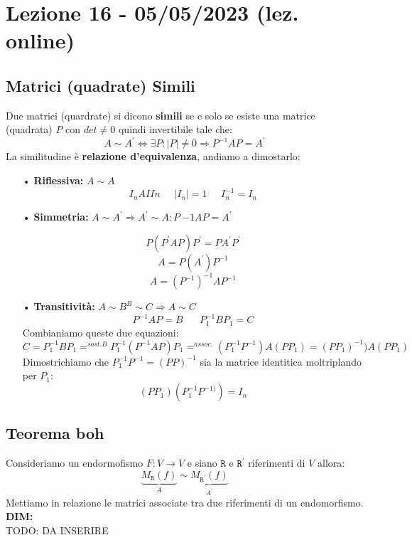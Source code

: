 \section{Lezione 16 - 05/05/2023 (lez. online)}

\subsection{Matrici (quadrate) Simili}
Due matrici (quardrate) si dicono \textbf{simili} se e solo se esiste una matrice (quadrata) $P$ con $det \neq 0$ quindi invertibile tale che:
$$ A \sim A^{\prime} \Leftrightarrow \exists P: |P| \neq 0 \Rightarrow P^{-1}AP=A^{\prime}$$
La similitudine è \textbf{relazione d'equivalenza}, andiamo a dimostarlo:
\begin{itemize}

\item[•]\textbf{Riflessiva:} $A \sim A$
$$  I_nAIIn \;\;\;\;\; |I_n| = 1 \;\;\;\;\; I_n^{-1} = I_n$$ 

\item[•]\textbf{Simmetria:} $ A \sim A^{\prime} \Rightarrow A^{\prime} \sim A: P~{-1}AP=A^{\prime}$

$$  P(P^{\prime}AP)P^{\prime} = PA^ {\prime}P^{\prime} $$
$$ A = P(A^{\prime})P^{-1}$$
$$ A = (P^{-1})^{-1}AP^{-1} $$

\item[•]\textbf{Transitività:} $A \sim B ^ B \sim C \Rightarrow A \sim C$
$$ P^{-1}AP = B \;\;\;\;\;\; P_1^{-1}BP_1 = C$$
Combianiamo queste due equazioni:
$$ C=P_1^{-1}BP_1 =^{sost. B} P_1^{-1}(P^{-1}AP)P_1 =^{assoc.} (P_1^{-1}P^{-1})A(PP_1) = (PP_1)^{-1})A(PP_1)  $$
Dimostrichiamo che $P_1^{-1}P^{-1} = (PP)^{-1}$ sia la matrice identitica moltriplando per $P_1$:
$$ (PP_1)(P_1^{-1}P^{-1)}) = I_n $$

\end{itemize}

\subsection{Teorema boh}
Consideriamo un endormofismo $F: V \rightarrow V$ e siano $\mathtt{R}$ e $\mathtt{R}^{\prime}$ riferimenti di $V$ allora:
$$ \underbrace{M_{\mathtt{R}}(f)}_A  \sim \underbrace{M_{\mathtt{R}^{\prime}}(f)}_{A^{\prime}}  $$
Mettiamo in relazione le matrici associate tra due riferimenti di un endomorfismo.\\
\textbf{DIM:}\\
TODO: DA INSERIRE

